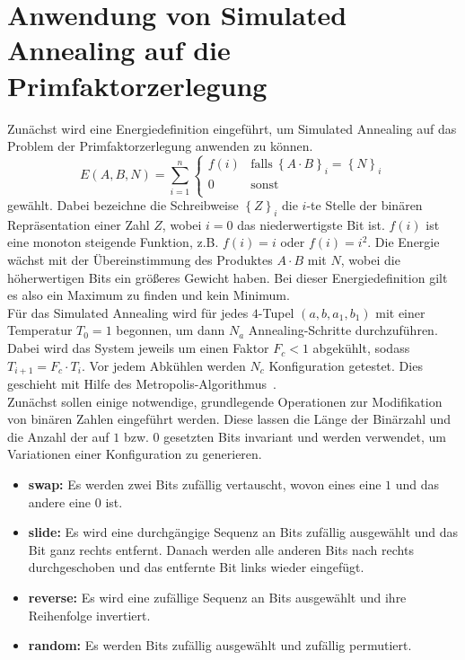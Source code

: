 \section{Anwendung von Simulated Annealing auf die Primfaktorzerlegung}\label{sec:annealfac}
Zunächst wird eine Energiedefinition eingeführt, um Simulated Annealing auf das Problem der Primfaktorzerlegung anwenden zu können.
\begin{equation*}
		E\left(A,B,N\right)=\sum\limits_{i=1}^n\begin{cases}
		  		f\left(i\right) & \mathrm{falls}\:{\left\{A\cdot B\right\}}_i={\left\{N\right\}}_i \\
						0 & \mathrm{sonst}\\
				\end{cases}
\end{equation*}
gewählt. Dabei bezeichne die Schreibweise ${\left\{Z\right\}}_i$ die $i$-te Stelle der binären Repräsentation einer Zahl $Z$, wobei $i=0$ das niederwertigste Bit ist. $f\left(i\right)$ ist eine monoton steigende Funktion, z.B. $f\left(i\right)=i$ oder $f\left(i\right)=i^2$. Die Energie wächst mit der Übereinstimmung des Produktes $A\cdot B$ mit $N$, wobei die höherwertigen Bits ein größeres Gewicht haben. Bei dieser Energiedefinition gilt es also ein Maximum zu finden und kein Minimum. \\
Für das Simulated Annealing wird für jedes $4$-Tupel $\left(a,b,a_1,b_1\right)$ mit einer Temperatur $T_0=1$ begonnen, um dann $N_a$ Annealing-Schritte durchzuführen. Dabei wird das System jeweils um einen Faktor $F_c < 1$ abgekühlt, sodass $T_{i+1}=F_c\cdot T_i$. Vor jedem Abkühlen werden $N_c$ Konfiguration getestet. Dies geschieht mit Hilfe des Metropolis-Algorithmus~\parencite{metropolis}. \\
Zunächst sollen einige notwendige, grundlegende Operationen zur Modifikation von binären Zahlen eingeführt werden. Diese lassen die Länge der Binärzahl und die Anzahl der auf $1$ bzw. $0$ gesetzten Bits invariant und werden verwendet, um Variationen einer Konfiguration zu generieren.
\begin{itemize}
		\item \textbf{swap:} Es werden zwei Bits zufällig vertauscht, wovon eines eine $1$ und das andere eine $0$ ist.
		\item \textbf{slide:} Es wird eine durchgängige Sequenz an Bits zufällig ausgewählt und das Bit ganz rechts entfernt. Danach werden alle anderen Bits nach rechts durchgeschoben und das entfernte Bit links wieder eingefügt.
		\item \textbf{reverse:} Es wird eine zufällige Sequenz an Bits ausgewählt und ihre Reihenfolge invertiert.
		\item \textbf{random:} Es werden Bits zufällig ausgewählt und zufällig permutiert.
\end{itemize}

